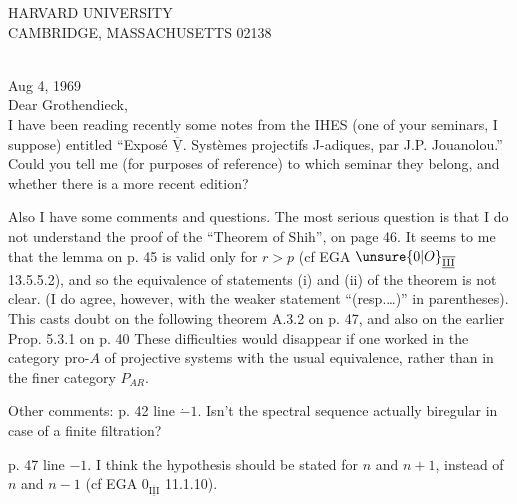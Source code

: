 \begin{center}
{\sffamily HARVARD UNIVERSITY\\
CAMBRIDGE, MASSACHUSETTS 02138}
\end{center}
\\
\hfill Aug 4, 1969\\

\noindent Dear Grothendieck,\\

I have been reading recently some notes from the IHES (one of your seminars, I suppose) entitled ``Exposé \(\overline{\underline{\mathrm{V}}}\). Systèmes
\reversemarginpar{}\normalmarginpar%
projectifs J-adiques, par J.P. Jouanolou.'' Could you tell me (for purposes of reference) to which seminar they belong, and whether there is a more recent edition?

Also I have some comments and questions. The most serious question is that I do not understand the proof of the ``Theorem of Shih'',  on page 46. It seems to me that the lemma on p. 45 is valid only for \(r>p\) (cf EGA \(\unsure{0|O}_{\overline{\underline{\mathrm{III}}}}\) 13.5.5.2), and so  the equivalence of statements (i) and (ii) of the theorem is not clear. (I do agree, however, with the weaker statement ``(resp.\ldots)'' in parentheses). This casts doubt on the following theorem A.3.2 on p. 47, and also on the earlier Prop. 5.3.1 on p. 40 These difficulties would disappear if one worked  in the category \(\mathrm{pro}\text{-}A\)
\margin{\figure{\tikz{\node[rotate=-15,inner sep=0pt]{\unsure{:}};}}}
of projective systems with the usual equivalence, rather than in the  finer category \(P_{AR}\).

Other comments: p. 42 line \(\dot{-}1\). Isn't the spectral sequence actually biregular in case of a finite filtration?

p. 47 line \(-1\). I think the hypothesis should be stated for \(n\) and \(n+1\), instead of \(n\) and \(n-1\) (cf EGA \(0_{\overline{\underline{\mathrm{III}}}}\) 11.1.10).
\clearpage
